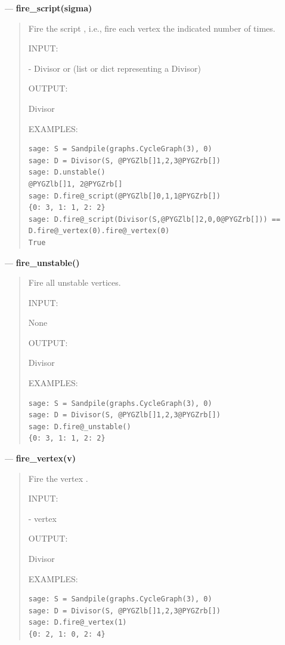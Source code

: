\documentclass[letterpaper,10pt,english]{manual}
\begin{document}
---
\hypertarget{fire-script-sigma-divisor}{}
\textbf{fire\_script(sigma)}
\begin{quote}

Fire the script , i.e., fire each vertex the indicated number
of times.

INPUT:

 - Divisor or (list or dict representing a Divisor)

OUTPUT:

Divisor

EXAMPLES:

\begin{Verbatim}[commandchars=@\[\]]
sage: S = Sandpile(graphs.CycleGraph(3), 0)
sage: D = Divisor(S, @PYGZlb[]1,2,3@PYGZrb[])
sage: D.unstable()
@PYGZlb[]1, 2@PYGZrb[]
sage: D.fire@_script(@PYGZlb[]0,1,1@PYGZrb[])
{0: 3, 1: 1, 2: 2}
sage: D.fire@_script(Divisor(S,@PYGZlb[]2,0,0@PYGZrb[])) == D.fire@_vertex(0).fire@_vertex(0)
True
\end{Verbatim}
\end{quote}

---
\hypertarget{fire-unstable-divisor}{}
\textbf{fire\_unstable()}
\begin{quote}

Fire all unstable vertices.

INPUT:

None

OUTPUT:

Divisor

EXAMPLES:

\begin{Verbatim}[commandchars=@\[\]]
sage: S = Sandpile(graphs.CycleGraph(3), 0)
sage: D = Divisor(S, @PYGZlb[]1,2,3@PYGZrb[])
sage: D.fire@_unstable()
{0: 3, 1: 1, 2: 2}
\end{Verbatim}
\end{quote}

---
\hypertarget{fire-vertex-v-divisor}{}
\textbf{fire\_vertex(v)}
\begin{quote}

Fire the vertex .

INPUT:

 - vertex

OUTPUT:

Divisor

EXAMPLES:

\begin{Verbatim}[commandchars=@\[\]]
sage: S = Sandpile(graphs.CycleGraph(3), 0)
sage: D = Divisor(S, @PYGZlb[]1,2,3@PYGZrb[])
sage: D.fire@_vertex(1)
{0: 2, 1: 0, 2: 4}
\end{Verbatim}
\end{quote}
\end{document}
